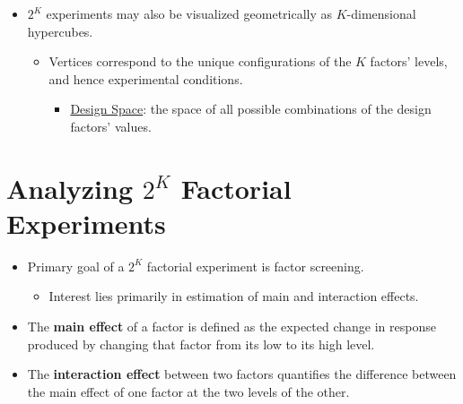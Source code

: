 \begin{itemize}[$\rightarrow$]
    \item $ 2^K $ experiments may also be visualized geometrically as $ K $-dimensional hypercubes.
          \begin{itemize}
              \item Vertices correspond to the unique configurations of the $ K $ factors' levels,
                    and hence experimental conditions.
                    \begin{itemize}[label={}]
                        \item \underline{Design Space}: the space of all possible combinations of the design factors' values.
                    \end{itemize}
          \end{itemize}
\end{itemize}
\section{Analyzing \texorpdfstring{$ 2^K $}{2K} Factorial Experiments}
\begin{itemize}
    \item Primary goal of a $2^K$ factorial experiment is factor screening.
          \begin{itemize}
              \item Interest lies primarily in estimation of main and interaction effects.
          \end{itemize}
\end{itemize}
\begin{itemize}[*]
    \item The \textbf{main effect} of a factor is defined as the expected change in response produced by changing that factor from
          its low to its high level.
    \item The \textbf{interaction effect} between two factors quantifies the difference between the main effect of one
          factor at the two levels of the other.
\end{itemize}
